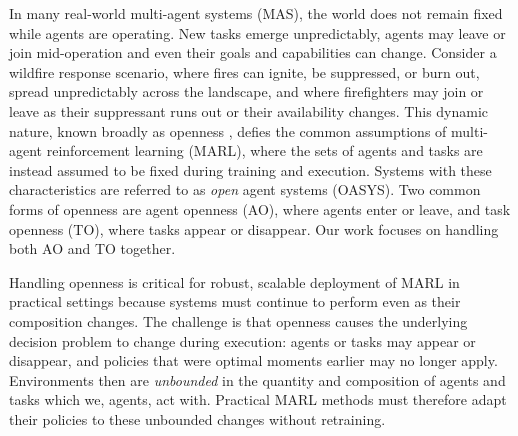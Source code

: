 In many real-world multi-agent systems (MAS), the world does not remain fixed while agents are operating. New tasks emerge unpredictably, agents may leave or join mid-operation and even their goals and capabilities can change. Consider a wildfire response scenario, where fires can ignite, be suppressed, or burn out, spread unpredictably across the landscape, and where firefighters may join or leave as their suppressant runs out or their availability changes. This dynamic nature, known broadly as openness \cite{aimag_eck}, defies the common assumptions of multi-agent reinforcement learning (MARL), where the sets of agents and tasks are instead assumed to be fixed during training and execution. Systems with these characteristics are referred to as \emph{open} agent systems (OASYS). Two common forms of openness \cite{aimag_eck} are agent openness (AO), where agents enter or leave, and task openness (TO), where tasks appear or disappear. Our work focuses on handling both AO and TO together.


Handling openness is critical for robust, scalable deployment of MARL in practical settings because systems must continue to perform even as their composition changes. The challenge is that openness causes the underlying decision problem to change during execution: agents or tasks may appear or disappear, and policies that were optimal moments earlier may no longer apply. Environments then are \emph{unbounded} in the quantity and composition of agents and tasks which we, agents, act with. Practical MARL methods must therefore adapt their policies to these unbounded changes without retraining.



